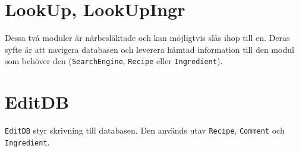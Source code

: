 \section{LookUp, LookUpIngr}\label{sec:ark.lookup}
Dessa två moduler är närbesläktade och kan möjligtvis slås ihop till en. Deras syfte är att navigera databasen och leverera hämtad information till den modul som behöver den (\verb=SearchEngine=, \verb=Recipe= eller \verb=Ingredient=).

\section{EditDB}\label{sec:ark.editdb}
\verb=EditDB= styr skrivning till databasen. Den används utav \verb=Recipe=, \verb=Comment= och \verb=Ingredient=.
